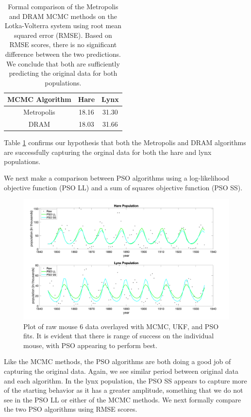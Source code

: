 \begin{table}[H]
\centering
        \begin{tabular}{c | c c}
            \cline{1-3}
            \textbf{MCMC Algorithm}  &\textbf{Hare} & \textbf{Lynx}\\
            \hline
            Metropolis & 18.16 & 31.30\\
            DRAM & 18.03 & 31.66
             \\\hline
            \hline
        \end{tabular}
    \caption{Formal comparison of the Metropolis and DRAM MCMC methods on the Lotka-Volterra system using root mean squared error (RMSE). Based on RMSE scores, there is no significant difference between the two predictions. We conclude that both are sufficiently predicting the original data for both populations.}
    \label{tab:LVmcmcpso}
\end{table}
Table \ref{tab:LVmcmcpso} confirms our hypothesis that both the Metropolis and DRAM algorithms are successfully capturing the orginal data for both the hare and lynx populations.
\par We next make a comparison between PSO algorithms using a log-likelihood objective function (PSO LL) and a sum of squares objective function (PSO SS).
\begin{figure}[H]
    \centering
    \includegraphics[width=15cm]{Final_Paper_Pieces/LV_Comparison_Figs/LVPSO.png}
    \caption{Plot of raw mouse 6 data overlayed with MCMC, UKF, and PSO fits. It is evident that there is range of success on the individual mouse, with PSO appearing to perform best.}
    \label{fig:LVpso}
\end{figure}
Like the MCMC methods, the PSO algorithms are both doing a good job of capturing the original data. Again, we see similar period between original data and each algorithm. In the lynx population, the PSO SS appears to capture more of the starting behavior as it has a greater amplitude, something that we do not see in the PSO LL or either of the MCMC methods. We next formally compare the two PSO algorithms using RMSE scores.
